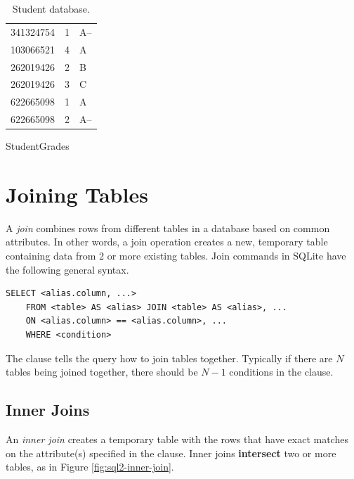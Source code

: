 \begin{table}[H]
\begin{subtable}{.35\textwidth}
\begin{tabular}{|l|l|l|}
        341324754 & 1 & A-- \\
        103066521 & 4 & A \\
        262019426 & 2 & B \\
        262019426 & 3 & C \\
        622665098 & 1 & A \\
        622665098 & 2 & A-- \\ \hline
    \end{tabular}
    \caption{StudentGrades}
    \label{table:sql2-student-grades}
\end{subtable}
\caption{Student database.}
\end{table}

\section*{Joining Tables} %

A \emph{join} combines rows from different tables in a database based on common attributes.
In other words, a join operation creates a new, temporary table containing data from 2 or more existing tables.
Join commands in SQLite have the following general syntax.
\begin{lstlisting}
SELECT <alias.column, ...>
    FROM <table> AS <alias> JOIN <table> AS <alias>, ...
    ON <alias.column> == <alias.column>, ...
    WHERE <condition>
\end{lstlisting}

The  clause tells the query how to join tables together.
Typically if there are $N$ tables being joined together, there should be $N-1$ conditions in the  clause.

\subsection*{Inner Joins} %

An \emph{inner join} creates a temporary table with the rows that have exact matches on the attribute(s) specified in the  clause.
Inner joins \textbf{intersect} two or more tables, as in Figure \ref{fig:sql2-inner-join}.

